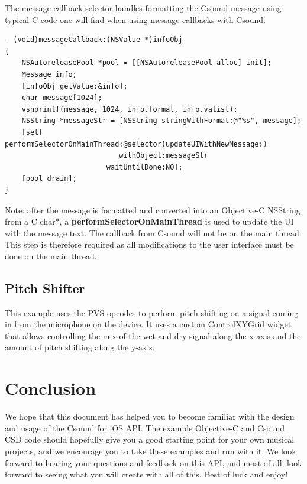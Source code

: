 \documentclass[11pt]{article}
\begin{document}
The message callback selector handles formatting the Csound message using typical C code one will find when using message callbacks with Csound:

\begin{lstlisting}[caption=Message Callback Selector Code]
- (void)messageCallback:(NSValue *)infoObj
{
    NSAutoreleasePool *pool = [[NSAutoreleasePool alloc] init];
    Message info;
    [infoObj getValue:&info];
    char message[1024];
    vsnprintf(message, 1024, info.format, info.valist);
    NSString *messageStr = [NSString stringWithFormat:@"%s", message];
    [self performSelectorOnMainThread:@selector(updateUIWithNewMessage:)
                           withObject:messageStr
                        waitUntilDone:NO];
    [pool drain];
}
\end{lstlisting}

Note: after the message is formatted and converted into an Objective-C NSString from a C char*, a \textbf{performSelectorOnMainThread} is used to update the UI with the message text.  The callback from Csound will not be on the main thread. This step is therefore required as all modifications to the user interface must be done on the main thread.

\subsection{Pitch Shifter}

This example uses the PVS opcodes to perform pitch shifting on a signal coming in from the microphone on the device.  It uses a custom ControlXYGrid widget that allows controlling the mix of the wet and dry signal along the x-axis and the amount of pitch shifting along the y-axis.


\section{Conclusion}

We hope that this document has helped you to become familiar with the design and usage of the Csound for iOS API. The example Objective-C and Csound CSD code should hopefully give you a good starting point for your own musical projects, and we encourage you to take these examples and run with it.  We look forward to hearing your questions and feedback on this API, and most of all, look forward to seeing what you will create with all of this.  Best of luck and enjoy!
\end{document}
